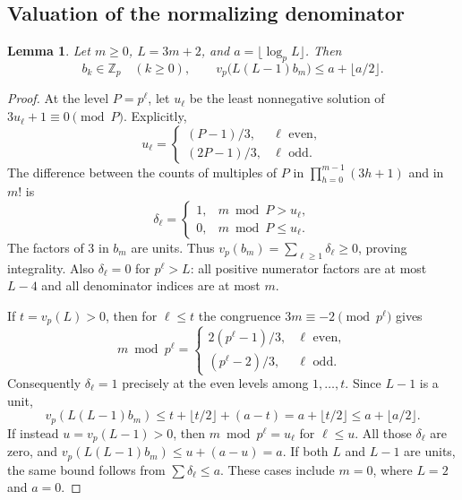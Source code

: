 \documentclass[11pt,letterpaper]{article}
\newtheorem{lemma}[theorem]{Lemma}
\numberwithin{equation}{section}
\begin{document}
\subsection{Valuation of the normalizing denominator}
\begin{lemma}\label{VII-lem:e-normalization-bound}
Let $m\ge0$, $L=3m+2$, and $a=\lfloor\log_p L\rfloor$. Then
\[
 b_k\in\mathbb Z_p\quad(k\ge0),\qquad
 v_p\bigl(L(L-1)b_m\bigr)\le a+\lfloor a/2\rfloor.
\]
\end{lemma}
\begin{proof}
At the level $P=p^\ell$, let $u_\ell$ be the least nonnegative
solution of $3u_\ell+1\equiv0\pmod P$. Explicitly,
\[
 u_\ell=\begin{cases}(P-1)/3,&\ell\text{ even},\\
                       (2P-1)/3,&\ell\text{ odd}.
          \end{cases}
\]
The difference between the counts of multiples of $P$ in
$\prod_{h=0}^{m-1}(3h+1)$ and in $m!$ is
\[
 \delta_\ell=\begin{cases}1,&m\bmod P>u_\ell,\\0,&m\bmod P\le u_\ell.
                  \end{cases}
\]
The factors of $3$ in $b_m$ are units. Thus
$v_p(b_m)=\sum_{\ell\ge1}\delta_\ell\ge0$, proving integrality.
Also $\delta_\ell=0$ for $p^\ell>L$: all positive numerator
factors are at most $L-4$ and all denominator indices are at most $m$.

If $t=v_p(L)>0$, then for $\ell\le t$ the congruence
$3m\equiv-2\pmod{p^\ell}$ gives
\[
 m\bmod p^\ell=\begin{cases}
 2(p^\ell-1)/3,&\ell\text{ even},\\
 (p^\ell-2)/3,&\ell\text{ odd}.
 \end{cases}
\]
Consequently $\delta_\ell=1$ precisely at the even levels among
$1,\ldots,t$. Since $L-1$ is a unit,
\[
 v_p(L(L-1)b_m)
 \le t+\lfloor t/2\rfloor+(a-t)
 =a+\lfloor t/2\rfloor\le a+\lfloor a/2\rfloor.
\]
If instead $u=v_p(L-1)>0$, then $m\bmod p^\ell=u_\ell$ for
$\ell\le u$. All those $\delta_\ell$ are zero, and
$v_p(L(L-1)b_m)\le u+(a-u)=a$.
If both $L$ and $L-1$ are units, the same bound follows from
$\sum\delta_\ell\le a$. These cases include $m=0$, where $L=2$
and $a=0$.
\end{proof}
\end{document}
